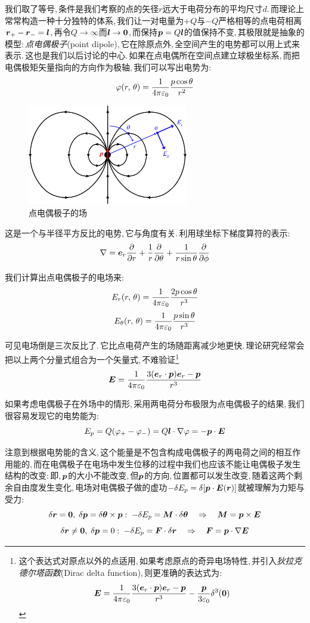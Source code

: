 我们取了等号,\,条件是我们考察的点的矢径$r$远大于电荷分布的平均尺寸$d$.\,而理论上常常构造一种十分独特的体系,\,我们让一对电量为$+Q$与$-Q$严格相等的点电荷相离$\boldsymbol{r}_+-\boldsymbol{r}_-=\boldsymbol{l}$,\,再令$Q\to\infty$而$\boldsymbol{l}\to \boldsymbol{0}$,\,而保持$\boldsymbol{p}=Q\boldsymbol{l}$的值保持不变,\,其极限就是抽象的模型:\,\emph{点电偶极子}(point dipole),\,它在除原点外,\,全空间产生的电势都可以用上式来表示.\,这也是我们以后讨论的中心.\,如果在点电偶所在空间点建立球极坐标系,\,而把电偶极矩矢量指向的方向作为极轴,\,我们可以写出电势为:
\[\varphi(r,\,\theta)=\frac{1}{4\pi\varepsilon_0}\frac{p\cos\theta}{r^2}\]
\begin{figure}
\centering
\vspace{-0.5cm}
\includegraphics[width=7cm]{image/7-1-13.png}
\caption{点电偶极子的场}
\end{figure}
这是一个与半径平方反比的电势,\,它与角度有关.\,利用球坐标下梯度算符的表示:
\[\nabla=\boldsymbol{e}_r \frac{\partial}{\partial r} +\frac{1}{r}\frac{\partial}{\partial \theta}+\frac{1}{r\sin\theta}\frac{\partial}{\partial \phi}\]

我们计算出点电偶极子的电场来:
\[E_r(r,\,\theta)=\frac{1}{4\pi\varepsilon_0}\frac{2p\cos\theta}{r^3}\]
\[E_\theta(r,\,\theta)=\frac{1}{4\pi\varepsilon_0}\frac{p\sin\theta}{r^3}\]

可见电场倒是三次反比了.\,它比点电荷产生的场随距离减少地更快.\,理论研究经常会把以上两个分量式组合为一个矢量式,\,不难验证\footnote{这个表达式对原点以外的点适用,\,如果考虑原点的奇异电场特性,\,并引入\emph{狄拉克德尔塔函数}(Dirac delta function),\,则更准确的表达式为:
\[\boldsymbol{E}=\frac{1}{4\pi\varepsilon_0} \frac{3(\boldsymbol{e}_r\cdot\boldsymbol{p})\boldsymbol{e}_r-\boldsymbol{p}}{r^3}-\frac{\boldsymbol{p}}{3\varepsilon_0}\delta^3(\boldsymbol{0})\]}
\[\boldsymbol{E}=\frac{1}{4\pi\varepsilon_0} \frac{3(\boldsymbol{e}_r\cdot\boldsymbol{p})\boldsymbol{e}_r-\boldsymbol{p}}{r^3}\]

如果考虑电偶极子在外场中的情形,\,采用两电荷分布极限为点电偶极子的结果,\,我们很容易发现它的电势能为:
\[E_p=Q(\varphi_+-\varphi_-)=Q\boldsymbol{l}\cdot\nabla\varphi=-\boldsymbol{p}\cdot\boldsymbol{E}\]

注意到根据电势能的含义,\,这个能量是不包含构成电偶极子的两电荷之间的相互作用能的,\,而在电偶极子在电场中发生位移的过程中我们也应该不能让电偶极子发生结构的改变:\,即,\,$\boldsymbol{p}$的大小不能改变,\,但$\boldsymbol{p}$的方向,\,位置都可以发生改变,\,随着这两个剩余自由度发生变化,\,电场对电偶极子做的虚功$-\delta E_p=\delta[\boldsymbol{p}\cdot\boldsymbol{E}(\boldsymbol{r})]$就被理解为力矩与受力:
\[\delta \boldsymbol{r}=\boldsymbol{0},\;\delta \boldsymbol{p}=\delta \boldsymbol{\theta}\times \boldsymbol{p}:\; -\delta E_p=\boldsymbol{M}\cdot \delta\boldsymbol{\theta}\quad \Rightarrow \quad \boldsymbol{M}=\boldsymbol{p}\times\boldsymbol{E}\]
\[\delta \boldsymbol{r}\neq\boldsymbol{0},\;\delta \boldsymbol{p}=0:\; -\delta E_p=\boldsymbol{F}\cdot \delta\boldsymbol{r}\quad \Rightarrow \quad \boldsymbol{F}=\boldsymbol{p}\cdot\nabla\boldsymbol{E}\]

